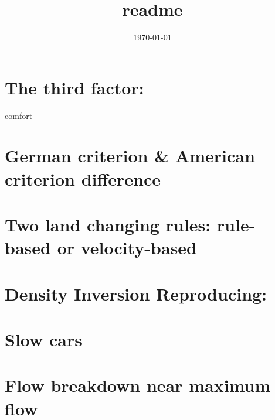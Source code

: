 \documentclass[11pt]{article}
\title{readme}
\author{}
\date{\today}
\begin{document}
\maketitle

\setcounter{tocdepth}{3}
\tableofcontents
\vspace*{1cm}
\section{The third factor:}
\label{sec-1}

comfort
\section{German criterion \& American criterion difference}
\label{sec-2}
\section{Two land changing rules: rule-based or velocity-based}
\label{sec-3}
\section{Density Inversion Reproducing:}
\label{sec-4}
\section{Slow cars}
\label{sec-5}
\section{Flow breakdown near maximum flow}
\label{sec-6}
\end{document}
